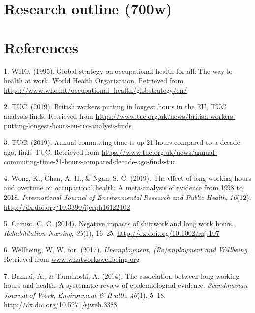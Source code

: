 \documentclass[]{article}
\begin{document}
\hypertarget{research-outline-700w}{%
\section{Research outline (700w)}\label{research-outline-700w}}

\newpage

\hypertarget{references}{%
\section*{References}\label{references}}

\hypertarget{refs}{}
\leavevmode\hypertarget{ref-WHO1995}{}%
1. WHO. (1995). Global strategy on occupational health for all: The way to health at work. World Health Organization. Retrieved from \url{https://www.who.int/occupational_health/globstrategy/en/}

\leavevmode\hypertarget{ref-TUC1}{}%
2. TUC. (2019). British workers putting in longest hours in the EU, TUC analysis finds. Retrieved from \url{https://www.tuc.org.uk/news/british-workers-putting-longest-hours-eu-tuc-analysis-finds}

\leavevmode\hypertarget{ref-TUC2}{}%
3. TUC. (2019). Annual commuting time is up 21 hours compared to a decade ago, finds TUC. Retrieved from \url{https://www.tuc.org.uk/news/annual-commuting-time-21-hours-compared-decade-ago-finds-tuc}

\leavevmode\hypertarget{ref-Wong2019}{}%
4. Wong, K., Chan, A. H., \& Ngan, S. C. (2019). The effect of long working hours and overtime on occupational health: A meta-analysis of evidence from 1998 to 2018. \emph{International Journal of Environmental Research and Public Health}, \emph{16}(12). \url{http://dx.doi.org/10.3390/ijerph16122102}

\leavevmode\hypertarget{ref-Caruso2014}{}%
5. Caruso, C. C. (2014). Negative impacts of shiftwork and long work hours. \emph{Rehabilitation Nursing}, \emph{39}(1), 16--25. \url{http://dx.doi.org/10.1002/rnj.107}

\leavevmode\hypertarget{ref-WhatWorksWellbeing2}{}%
6. Wellbeing, W. W. for. (2017). \emph{Unemployment, (Re)employment and Wellbeing}. Retrieved from \url{www.whatworkswellbeing.org}

\leavevmode\hypertarget{ref-Bannai2014}{}%
7. Bannai, A., \& Tamakoshi, A. (2014). The association between long working hours and health: A systematic review of epidemiological evidence. \emph{Scandinavian Journal of Work, Environment \& Health}, \emph{40}(1), 5--18. \url{http://dx.doi.org/10.5271/sjweh.3388}
\end{document}
